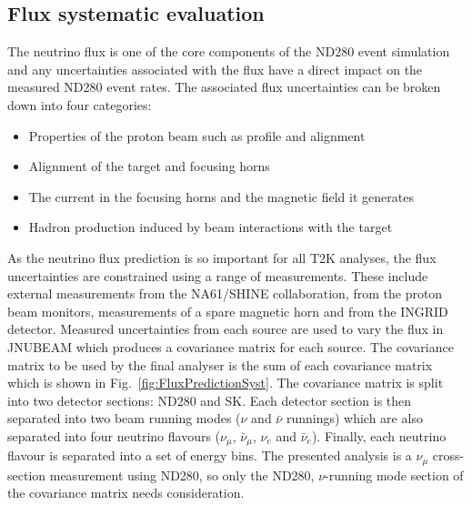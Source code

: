 \subsection{Flux systematic evaluation}
\label{subsec:FluxSystematic}
The neutrino flux is one of the core components of the ND280 event simulation and any uncertainties associated with the flux have a direct impact on the measured ND280 event rates.  The associated flux uncertainties can be broken down into four categories:
\begin{itemize}
  \item Properties of the proton beam such as profile and alignment
  \item Alignment of the target and focusing horns
  \item The current in the focusing horns and the magnetic field it generates
  \item Hadron production induced by beam interactions with the target
\end{itemize}
As the neutrino flux prediction is so important for all T2K analyses, the flux uncertainties are constrained using a range of measurements.  These include external measurements from the NA61/SHINE collaboration, from the proton beam monitors, measurements of a spare magnetic horn and from the INGRID detector.  Measured uncertainties from each source are used to vary the flux in JNUBEAM which produces a covariance matrix for each source.  The covariance matrix to be used by the final analyser is the sum of each covariance matrix which is shown in Fig.~\ref{fig:FluxPredictionSyst}.  The covariance matrix is split into two detector sections: ND280 and SK.  Each detector section is then separated into two beam running modes ($\nu$ and $\bar{\nu}$ runnings) which are also separated into four neutrino flavours ($\nu_\mu$, $\bar{\nu}_\mu$, $\nu_e$ and $\bar{\nu}_e$).  Finally, each neutrino flavour is separated into a set of energy bins.  The presented analysis is a $\nu_\mu$ cross-section measurement using ND280, so only the ND280, $\nu$-running mode section of the covariance matrix needs consideration.
